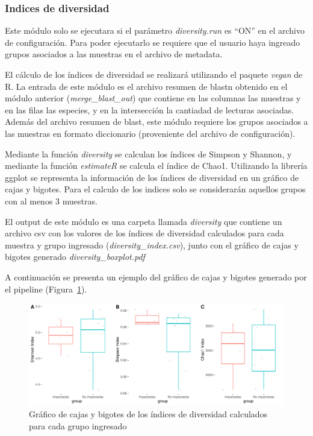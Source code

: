 \subsubsection{Indices de diversidad}
Este módulo solo se ejecutara si el parámetro \textit{diversity.run} es ``ON'' en el archivo de configuración. 
Para poder ejecutarlo se requiere que el usuario haya ingreado grupos asociados a las muestras en el archivo de metadata.

El cálculo de los índices de diversidad se realizará utilizando el paquete \textit{vegan} de R.
La entrada de este módulo es el archivo resumen de blastn obtenido en el módulo anterior (\textit{merge\_blast\_out}) que contiene en las columnas las muestras y en las filas las especies, y  en la intersección la cantiadad de lecturas asociadas.
Además del archivo resumen de blast, este módulo requiere los grupos asociados a las muestras en formato diccionario (proveniente del archivo de configuración).

Mediante la función \textit{diversity} se calculan los índices de Simpson y Shannon, y mediante la función \textit{estimateR} se calcula el índice de Chao1.
Utilizando la librería ggplot se representa la información de los índices de diversidad en un gráfico de cajas y bigotes.
Para el calculo de los indices solo se considerarán aquellos grupos con al menos 3 muestras.

El output de este módulo es una carpeta llamada \textit{diversity} que contiene un archivo csv con los valores de los índices de diversidad calculados para cada muestra y grupo ingresado (\textit{diversity\_index.csv}), junto con el gráfico de cajas y bigotes generado \textit{diversity\_boxplot.pdf}

A continuación se presenta un ejemplo del gráfico de cajas y bigotes generado por el pipeline (Figura~\ref{fig:pipeline-diversity_boxplot}).
\begin{figure}[H]
    \centering
    \includegraphics[width=0.9\linewidth]{images/pipeline/diversity_boxplot.pdf}
    \caption{Gráfico de cajas y bigotes de los índices de diversidad calculados para cada grupo ingresado}
    \label{fig:pipeline-diversity_boxplot}
\end{figure}

